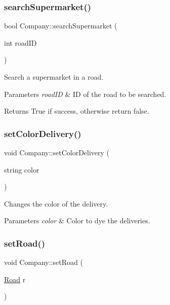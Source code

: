 \subsubsection{\texorpdfstring{search\+Supermarket()}{searchSupermarket()}}
{\footnotesize\ttfamily bool Company\+::search\+Supermarket (\begin{DoxyParamCaption}\item[{int}]{road\+ID }\end{DoxyParamCaption})}



Search a supermarket in a road. 


\begin{DoxyParams}{Parameters}
{\em road\+ID} & ID of the road to be searched.\\
\hline
\end{DoxyParams}
\begin{DoxyReturn}{Returns}
True if success, otherwise return false. 
\end{DoxyReturn}
\mbox{\label{class_company_a402565d3fea370859d04d2b06d083bb0}} 
\subsubsection{\texorpdfstring{set\+Color\+Delivery()}{setColorDelivery()}}
{\footnotesize\ttfamily void Company\+::set\+Color\+Delivery (\begin{DoxyParamCaption}\item[{string}]{color }\end{DoxyParamCaption})}



Changes the color of the delivery. 


\begin{DoxyParams}{Parameters}
{\em color} & Color to dye the deliveries. \\
\hline
\end{DoxyParams}
\mbox{\label{class_company_a16143da40ff033ea6122358b75f488c2}} 
\subsubsection{\texorpdfstring{set\+Road()}{setRoad()}}
{\footnotesize\ttfamily void Company\+::set\+Road (\begin{DoxyParamCaption}\item[{\hyperlink{class_road}{Road}}]{r }\end{DoxyParamCaption})}



